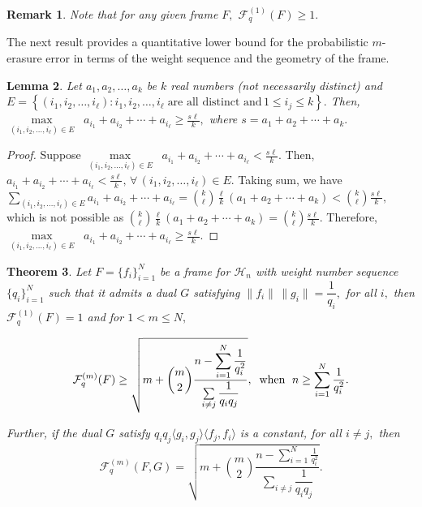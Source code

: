 \documentclass[final,1p,times]{elsarticle}
\newtheorem{thm}{Theorem}[section]
\newtheorem{lem}[thm]{Lemma}
\newtheorem{rem}[thm]{Remark}
\begin{document}
\begin{rem}\label{remark3point5}
    Note that for any given frame $F,$ $\mathcal{F}_{q}^{(1)} (F) \geq 1.$
\end{rem}







The next result provides a quantitative lower bound for the probabilistic $m$-erasure error in terms of the weight sequence and the geometry of the frame. 

\begin{lem}\label{lemma3point6}
	Let $a_1,a_2,\ldots,a_k$ be $k$ real numbers (not necessarily distinct) and \\ 
	$ E= \left\{ (i_1,i_2,\ldots,i_\ell): i_1,i_2,\ldots,i_\ell \;\text{are all distinct and}\, 1 \leq i_j \leq k  \right\}.$ Then, $\max\limits_{(i_1,i_2,\ldots,i_\ell)\in E}\;\; a_{i_1}+ a_{i_2}+ \cdots + a_{i_\ell} \geq \frac{s\ell}{k},$ where $s = a_1+a_2+\cdots+a_k.$
\end{lem}





\begin{proof}
	Suppose $\max\limits_{(i_1,i_2,\ldots,i_\ell)\in E}\;\; a_{i_1}+ a_{i_2}+ \cdots + a_{i_\ell} < \frac{s\ell}{k}.$ Then, $a_{i_1}+ a_{i_2}+ \cdots + a_{i_\ell} < \frac{s\ell}{k},\,\forall \, \left(i_1, i_2,\ldots, i_\ell\right) \in E.$ Taking sum, we have $\sum\limits_{\left(i_1, i_2,\ldots, i_\ell\right) \in E} a_{i_1}+ a_{i_2}+ \cdots + a_{i_\ell} = {{k}\choose{\ell}}\frac{\ell}{k}\left( a_1 + a_2 + \cdots +a_k  \right) < {{k}\choose{\ell}}\frac{s\ell}{k},$ which is not possible as \; ${{k}\choose{\ell}}\frac{\ell}{k}\left( a_1 + a_2 + \cdots +a_k  \right) = {{k}\choose{\ell}}\frac{s\ell}{k}.$ Therefore, $\max\limits_{(i_1,i_2,\ldots,i_\ell)\in E}\;\; a_{i_1}+ a_{i_2}+ \cdots + a_{i_\ell} \geq \frac{s\ell}{k}.$
\end{proof}




\begin{thm}\label{thm3point5}
Let $F = \{f_i\}_{i=1}^N$ be a frame for $\mathcal{H}_n $ with weight number sequence $\{q_i\}_{i=1}^N$  such that it admits a dual $G$   satisfying $\|f_i\|\,\|g_i\| = \dfrac{1}{q_i},$ for all $i,$ then $\mathcal{F}_{q}^{(1)} (F) = 1$ and for $1 < m \leq N,\,$ 

$$\mathcal{F}_{q}^{(m)} (F) \geq 
				\sqrt{m + {{m}\choose{2}}\dfrac{n -\displaystyle{\sum_{i=1}^N \frac{1}{q_{i}^2}}}{\sum\limits_{i\neq j}\dfrac{1}{q_i q_j}}}, \;\;\text{when\; $n \geq \sum\limits_{i=1}^N \frac{1}{q_{i}^2}$}. $$


 Further, if the dual $G$ satisfy  $q_i q_j \langle g_i, g_j \rangle \langle f_j, f_i \rangle $ is a constant, for all $i \neq j,$ then
 $$\mathcal{F}_{q}^{(m)} (F,G) =
				\sqrt{m + {{m}\choose{2}}\dfrac{n -\displaystyle{\sum_{i=1}^N \frac{1}{q_{i}^2}}}{\sum\limits_{i\neq j}\dfrac{1}{q_i q_j}}}.$$
\end{thm}
\end{document}
